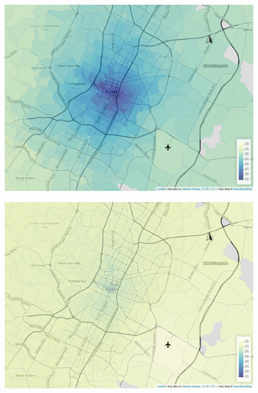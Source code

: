 \begin{figure}[htb]
    \centering
    \begin{minipage}[t]{0.48\linewidth}
        \centering
        \includegraphics[width=\linewidth]{img/quantile_9_5.png}
        \label{fig:quantiles:0.5:a}
    \end{minipage}
    \begin{minipage}[t]{0.48\linewidth}
        \centering
        \includegraphics[width=\linewidth]{img/quantile_43_5.png}
        \label{fig:quantiles:0.5:b}
    \end{minipage}\hfill
    \begin{minipage}[t]{.48\linewidth}

\end{minipage}
\end{figure}
